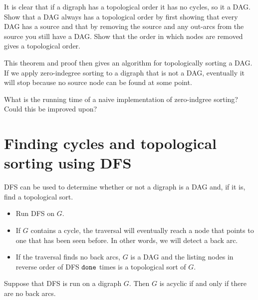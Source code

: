 \begin{Boxample}[8]
It is clear that if a digraph has a topological order it has no cycles, so it a DAG. 
Show that a DAG always has a topological order by first showing that every DAG has a source
and that by removing the source and any out-arcs from the source you still have a DAG. 
Show that the order in which nodes are removed gives a topological order.
\end{Boxample}

This theorem and proof then gives an algorithm 
for topologically sorting a DAG. 
If we apply zero-indegree sorting to a digraph that is not a DAG, 
eventually it will stop because no source node can be found at some point.

\begin{Boxample}[3]
What is the running time of a naive implementation of zero-indgree sorting? Could this be improved upon?
\end{Boxample}

\section{Finding cycles and topological sorting using DFS}
DFS can be used to determine whether or not a digraph is a DAG and, if it is, find a topological sort.
\begin{itemize}
  \item Run DFS on $G$.
  \item If $G$ contains a cycle, the traversal will eventually reach a node that points to one that has been seen before. 
  In other words, we will detect a back arc. 
  \item If the traversal finds no back arcs, $G$ is a DAG 
  and the listing nodes in reverse order of DFS $\operatorname{\text{\texttt{done}}}$ times is a topological sort of $G$.
\end{itemize}

\begin{Theorem} \label{thm:findDAG}
Suppose that DFS is run on a digraph $G$. Then $G$ is acyclic if and only if there are no back arcs.
\end{Theorem}
%

